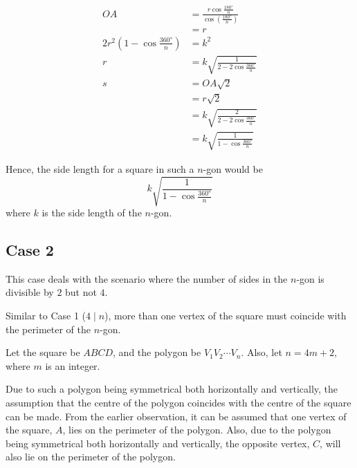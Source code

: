 \documentclass[12pt]{scrartcl}
\begin{document}
\begin{align*}
	OA                                             & = \frac{r \cos \frac{\ang{180}}{n}}{\cos \left(\frac{\ang{180}}{n}\right)} \\
	                                               & = r                                                                        \\
	2r^2 \left(1 - \cos \frac{\ang{360}}{n}\right) & = k^2                                                                      \\
	r                                              & = k\sqrt{\frac{1}{2 - 2\cos\frac{\ang{360}}{n}}}                           \\
	s                                              & = OA\sqrt{2}                                                               \\
	                                               & = r\sqrt{2}                                                                \\
	                                               & = k\sqrt{\frac{2}{2 - 2\cos\frac{\ang{360}}{n}}}                           \\
	                                               & = k\sqrt{\frac{1}{1 - \cos\frac{\ang{360}}{n}}}
\end{align*}

Hence, the side length for a square in such a $n$-gon would be
\begin{equation}
	k\sqrt{\frac{1}{1 - \cos\frac{\ang{360}}{n}}}
\end{equation}
where $k$ is the side length of the $n$-gon.

\pagebreak

\subsection{Case 2}
This case deals with the scenario where the number of sides in the $n$-gon is divisible by $2$ but not $4$.

Similar to Case 1 ($4\mid n$), more than one vertex of the square must coincide with the perimeter of the $n$-gon.

Let the square be $ABCD$, and the polygon be $V_{1}V_{2} \cdots V_{n}$. Also, let \(n = 4m + 2\), where $m$ is an integer.

Due to such a polygon being symmetrical both horizontally and vertically, the assumption that the centre of the polygon coincides with the centre of the square can be made. From the earlier observation, it can be assumed that one vertex of the square, $A$, lies on the perimeter of the polygon. Also, due to the polygon being symmetrical both horizontally and vertically, the opposite vertex, $C$, will also lie on the perimeter of the polygon.
\end{document}
